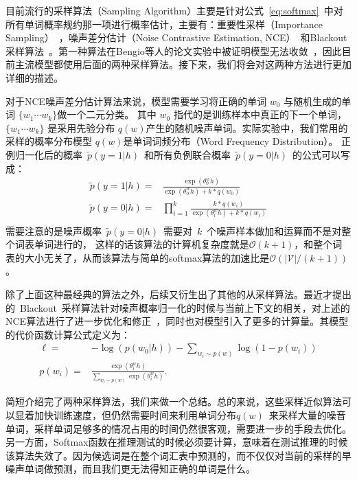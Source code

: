 目前流行的采样算法（Sampling Algorithm）主要是针对公式~\ref{eq:softmax}~中对所有单词概率规约那一项进行概率估计，主要有：重要性采样（Importance Sampling）~，噪声差分估计（Noise Contrastive Estimation, NCE）~和Blackout 采样算法~。第一种算法在Bengio等人的论文实验中被证明模型无法收敛~，因此目前主流模型都使用后面的两种采样算法。接下来，我们将会对这两种方法进行更加详细的描述。

对于NCE噪声差分估计算法来说，模型需要学习将正确的单词 $w_0$ 与随机生成的单词 $\{w_1\cdots w_k\}$做一个二元分类。 其中 $w_0$ 指代的是训练样本中真正的下一个单词， $\{w_1\cdots w_k\}$ 是采用先验分布  $q(w)$产生的随机噪声单词。实际实验中，我们常用的采样的概率分布模型 $q(w)$是单词词频分布（Word Frequency Distribution）。 正例归一化后的概率~$\tilde{p}(y=1|h)$~和所有负例联合概率~$\tilde{p}(y=0|h)$~的公式可以写成：
\begin{equation}\label{equ:nce}
\begin{split}
  \tilde{p}(y=1|h)=&\frac{\exp( \theta^w_0 h)}{ \exp( \theta^w_0 h)+k *q(w_0)}\\
  \tilde{p}(y=0|h)=&\prod_{i=1}^{k}\frac{k *q(w_i)}{\exp( \theta^w_i h)+k *q(w_i)}\\
\end{split}
\end{equation}
需要注意的是噪声概率~$\tilde{p}(y=0|h)$~需要对~$k$~个噪声样本做加和运算而不是对整个词表单词进行的， 这样的话该算法的计算机复杂度就是$\mathcal{O}(k+1)$，和整个词表的大小无关了，从而该算法与简单的softmax算法的加速比是$\mathcal{O}(\mathcal{|V|}/(k+1))$。

除了上面这种最经典的算法之外，后续又衍生出了其他的从采样算法。最近才提出的~Blackout~采样算法针对噪声概率归一化的时候与当前上下文的相关，对上述的NCE算法进行了进一步优化和修正~，同时也对模型引入了更多的计算量。其模型的代价函数计算公式定义为：
\begin{equation}
\begin{split}
  \ell=&-\log(p(w_0|h)) - \sum_{w_i \sim p(w)} \log(1 - p(w_i))\\
p(w_i) =& \frac{\exp(\theta^w_i h)}{\sum_{w_i \sim p(w)} \exp(\theta^w_i h)}.
\end{split}
\end{equation}

简短介绍完了两种采样算法，我们来做一个总结。总的来说，这些采样近似算法可以显着加快训练速度，但仍然需要时间来利用单词分布$q(w)$~来采样大量的噪音单词，采样单词足够多的情况占用的时间仍然很客观，需要进一步的手段去优化。 另一方面，Softmax函数在推理测试的时候必须要计算，意味着在测试推理的时候该算法失效了。因为候选词是在整个词汇表中预测的，而不仅仅对当前的采样的早噪声单词做预测，而且我们更无法得知正确的单词是什么。

